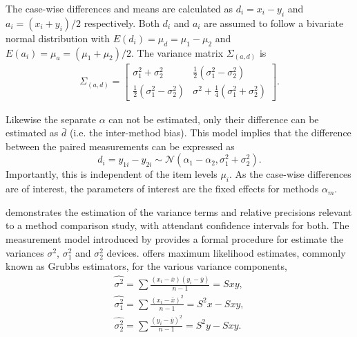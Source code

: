 \documentclass[12pt, a4paper]{report}
\theoremstyle{plain}
\theoremstyle{definition}
\theoremstyle{remark}
\begin{document}
The case-wise differences and means are calculated as $d_{i} =
x_{i}-y_{i}$ and $a_{i} = (x_{i}+y_{i})/2$  respectively. Both
$d_{i}$ and $a_{i}$ are assumed to follow a bivariate normal
distribution with $E(d_{i})= \mu_{d} = \mu_{1} - \mu_{2}$ and
$E(a_{i})= \mu_{a} = (\mu_{1} + \mu_{2})/2$. The variance matrix
$\Sigma_{(a,d)}$ is
\begin{eqnarray}
\Sigma_{(a,d)}= \left[\begin{matrix}
\sigma^{2}_{1}+\sigma^{2}_{2}&\frac{1}{2}(\sigma^{2}_{1}-\sigma^{2}_{2})\\
\frac{1}{2}(\sigma^{2}_{1}-\sigma^{2}_{2})&\sigma^{2}+
\frac{1}{4}(\sigma^{2}_{1}+\sigma^{2}_{2})
\end{matrix} \right].
\end{eqnarray}


Likewise the separate $\alpha$ can not be estimated, only their difference can be estimated as $\bar{d}$ (i.e. the inter-method bias). This model implies that the difference between the paired measurements can be expressed as
\[ d_{i} = y_{1i} - y_{2i} \sim \mathcal{N} (\alpha_{1} - \alpha_{2}, \sigma^2_{1} + \sigma^2_{2}). \]
Importantly, this is independent of the item levels $\mu_i$. As the case-wise differences are of interest, the parameters of interest are the fixed effects for methods $\alpha_{m}$.

\citet{Kinsella} demonstrates the estimation of the variance terms and relative precisions relevant to a method comparison study, with attendant confidence intervals for both. The measurement model introduced by \citet{Grubbs48,Grubbs73} provides a formal procedure for estimate the variances $\sigma^2$, $\sigma^2_{1}$ and $\sigma^2_{2}$ devices. \citet{Grubbs48} offers maximum likelihood estimates, commonly known as Grubbs estimators, for the various variance components, 
\begin{eqnarray*}
	\hat{\sigma^{2}} = \sum{\frac{(x_{i}-\bar{x})(y_{i}-\bar{y})}{n-1}} = Sxy,\\
	\hat{\sigma^{2}_{1}} = \sum{\frac{(x_{i}-\bar{x})^{2}}{n-1}} =S^{2}x - Sxy,  \\
	\hat{\sigma^{2}_{2}} =
	\sum{\frac{(y_{i}-\bar{y})^{2}}{n-1}} = S^{2}y - Sxy.
\end{eqnarray*}

\end{document}
